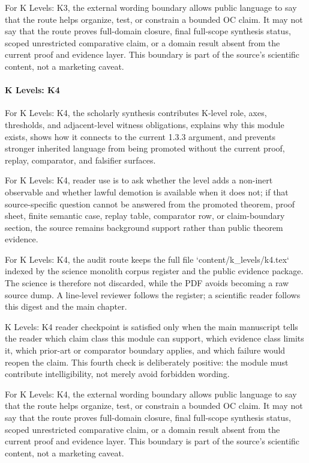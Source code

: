 For K Levels: K3, the external wording boundary allows public language to say that the route helps organize, test, or constrain a bounded OC claim. It may not say that the route proves full-domain closure, final full-scope synthesis status, scoped unrestricted comparative claim, or a domain result absent from the current proof and evidence layer. This boundary is part of the source's scientific content, not a marketing caveat.


\paragraph{K Levels: K4}

For K Levels: K4, the scholarly synthesis contributes K-level role, axes, thresholds, and adjacent-level witness obligations, explains why this module exists, shows how it connects to the current 1.3.3 argument, and prevents stronger inherited language from being promoted without the current proof, replay, comparator, and falsifier surfaces.


For K Levels: K4, reader use is to ask whether the level adds a non-inert observable and whether lawful demotion is available when it does not; if that source-specific question cannot be answered from the promoted theorem, proof sheet, finite semantic case, replay table, comparator row, or claim-boundary section, the source remains background support rather than public theorem evidence.


For K Levels: K4, the audit route keeps the full file `content/k\_levels/k4.tex` indexed by the science monolith corpus register and the public evidence package. The science is therefore not discarded, while the PDF avoids becoming a raw source dump. A line-level reviewer follows the register; a scientific reader follows this digest and the main chapter.


K Levels: K4 reader checkpoint is satisfied only when the main manuscript tells the reader which claim class this module can support, which evidence class limits it, which prior-art or comparator boundary applies, and which failure would reopen the claim. This fourth check is deliberately positive: the module must contribute intelligibility, not merely avoid forbidden wording.


For K Levels: K4, the external wording boundary allows public language to say that the route helps organize, test, or constrain a bounded OC claim. It may not say that the route proves full-domain closure, final full-scope synthesis status, scoped unrestricted comparative claim, or a domain result absent from the current proof and evidence layer. This boundary is part of the source's scientific content, not a marketing caveat.


